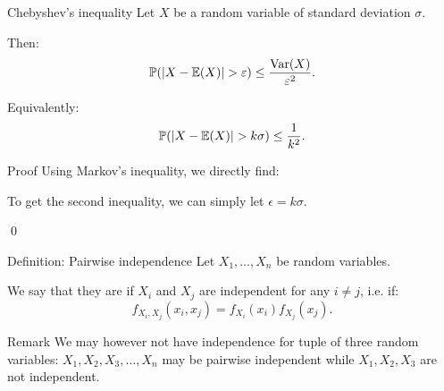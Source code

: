 \documentclass[a4paper]{article}
\begin{document}
\begin{parag}{Chebyshev's inequality}
    Let $X$ be a random variable of standard deviation $\sigma$.

    Then: 
    \[\prob\left(\left|X - \exval\left(X\right)\right| > \epsilon\right) \leq \frac{\Var\left(X\right)}{\epsilon^2}.\]

    Equivalently: 
    \[\prob\left(\left|X - \exval\left(X\right)\right| > k \sigma\right) \leq \frac{1}{k^2}.\]

    \begin{subparag}{Proof}
        Using Markov's inequality, we directly find: 

        To get the second inequality, we can simply let $\epsilon = k \sigma$.
        
        \qed
    \end{subparag}
\end{parag}

\begin{parag}{Definition: Pairwise independence}
    Let $X_1, \ldots, X_n$ be random variables.

    We say that they are  if $X_i$ and $X_j$ are independent for any $i \neq j$, i.e. if:
    \[f_{X_i, X_j}\left(x_i, x_j\right) = f_{X_i}\left(x_i\right) f_{X_j}\left(x_j\right).\]

    \begin{subparag}{Remark}
        We may however not have independence for tuple of three random variables: $X_1, X_2, X_3, \ldots, X_n$ may be pairwise independent while $X_1, X_2, X_3$ are not independent.
    \end{subparag}
\end{parag}
\end{document}
